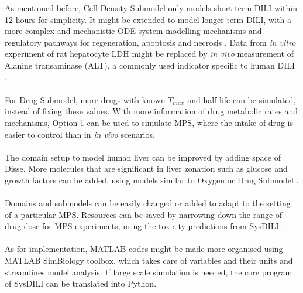 \documentclass[12pt]{article}
\begin{document}
As mentioned before, Cell Density Submodel only models short term DILI within 12 hours for simplicity. It might be extended to model longer term DILI, with a more complex and mechanistic ODE system modelling mechanisms and regulatory pathways for regeneration, apoptosis and necrosis \cite{furchtgottModelLiverRegeneration2009,remienMathematicalModelingLiver2012}. Data from \textit{in vitro} experiment of rat hepatocyte LDH might be replaced by \textit{in vivo} measurement of Alanine transaminase (ALT), a commonly used indicator specific to human DILI \cite{gianniniLiverEnzymeAlteration2005,watkinsDrugSafetySciences2011a}.\\\\
For Drug Submodel, more drugs with known $T_{max}$ and half life can be simulated, instead of fixing these values. With more information of drug metabolic rates and mechanisms, Option 1 can be used to simulate MPS, where the intake of drug is easier to control than in \textit{in vivo} scenarios.\\\\
The domain setup to model human liver can be improved by adding space of Disse. More molecules that are significant in liver zonation such as glucose and growth factors can be added, using models similar to Oxygen or Drug Submodel \cite{kietzmannMetabolicZonationLiver2017a}.\\\\Domains and submodels can be easily changed or added to adapt to the setting of a particular MPS. Resources can be saved by narrowing down the range of drug dose for MPS experiments, using the toxicity predictions from SysDILI.\\\\
As for implementation, MATLAB codes might be made more organised using MATLAB SimBiology toolbox, which takes care of variables and their units and streamlines model analysis. If large scale simulation is needed, the core program of SysDILI can be translated into Python.
\end{document}
